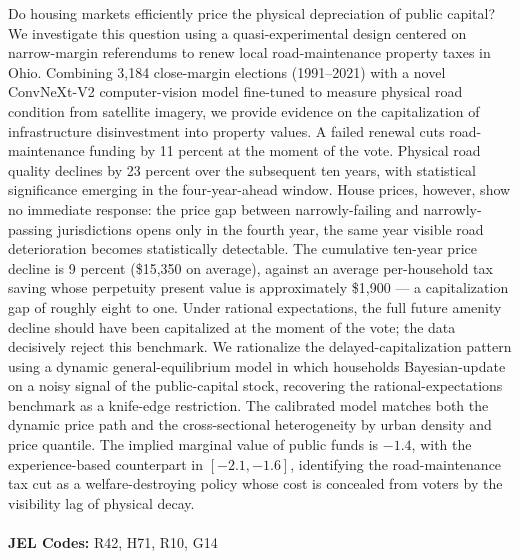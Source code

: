 
\noindent Do housing markets efficiently price the physical depreciation of public capital? We investigate this question using a quasi-experimental design centered on narrow-margin referendums to renew local road-maintenance property taxes in Ohio. Combining 3,184 close-margin elections (1991--2021) with a novel ConvNeXt-V2 computer-vision model fine-tuned to measure physical road condition from satellite imagery, we provide evidence on the capitalization of infrastructure disinvestment into property values. A failed renewal cuts road-maintenance funding by 11 percent at the moment of the vote. Physical road quality declines by 23 percent over the subsequent ten years, with statistical significance emerging in the four-year-ahead window. House prices, however, show no immediate response: the price gap between narrowly-failing and narrowly-passing jurisdictions opens only in the fourth year, the same year visible road deterioration becomes statistically detectable. The cumulative ten-year price decline is 9 percent (\$15{,}350 on average), against an average per-household tax saving whose perpetuity present value is approximately \$1{,}900 --- a capitalization gap of roughly eight to one. Under rational expectations, the full future amenity decline should have been capitalized at the moment of the vote; the data decisively reject this benchmark. We rationalize the delayed-capitalization pattern using a dynamic general-equilibrium model in which households Bayesian-update on a noisy signal of the public-capital stock, recovering the rational-expectations benchmark as a knife-edge restriction. The calibrated model matches both the dynamic price path and the cross-sectional heterogeneity by urban density and price quantile. The implied marginal value of public funds is $-1.4$, with the experience-based counterpart in $[-2.1, -1.6]$, identifying the road-maintenance tax cut as a welfare-destroying policy whose cost is concealed from voters by the visibility lag of physical decay.
\\
\vspace{0in}\\
\noindent\textbf{JEL Codes:} R42, H71, R10, G14\\